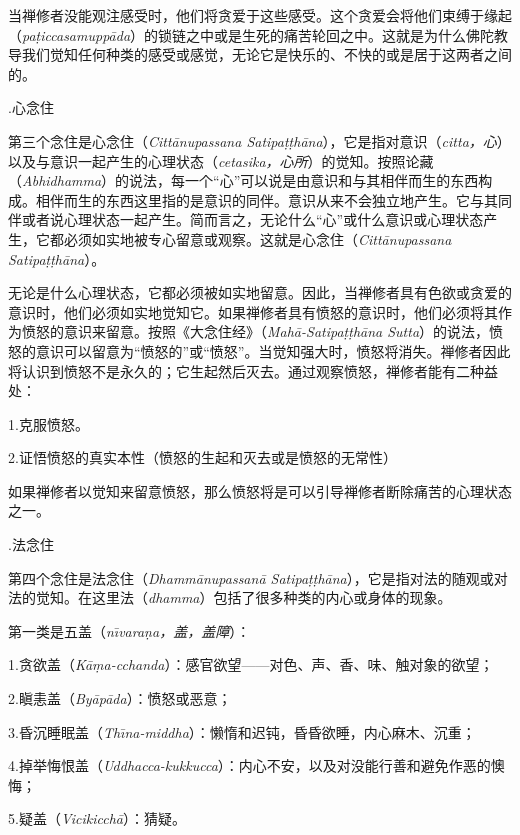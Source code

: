 当禅修者没能观注感受时，他们将贪爱于这些感受。这个贪爱会将他们束缚于缘起（{\it pa\d ticcasamupp\=ada}）的锁链之中或是生死的痛苦轮回之中。这就是为什么佛陀教导我们觉知任何种类的感受或感觉，无论它是快乐的、不快的或是居于这两者之间的。

.\1心念住

第三个念住是心念住（{\it Citt\=anupassana Satipa\d t\d th\=ana}），它是指对意识（{\it citta，心}）以及与意识一起产生的心理状态（{\it cetasika，心所}）的觉知。按照论藏（{\it Abhidhamma}）的说法，每一个“心”可以说是由意识和与其相伴而生的东西构成。相伴而生的东西这里指的是意识的同伴。意识从来不会独立地产生。它与其同伴或者说心理状态一起产生。简而言之，无论什么“心”或什么意识或心理状态产生，它都必须如实地被专心留意或观察。这就是心念住（{\it Citt\=anupassana Satipa\d t\d th\=ana}）。

无论是什么心理状态，它都必须被如实地留意。因此，当禅修者具有色欲或贪爱的意识时，他们必须如实地觉知它。如果禅修者具有愤怒的意识时，他们必须将其作为愤怒的意识来留意。按照《大念住经》（{\it Mah\=a-Satipa\d t\d th\=ana Sutta}）的说法，愤怒的意识可以留意为“愤怒的”或“愤怒”。当觉知强大时，愤怒将消失。禅修者因此将认识到愤怒不是永久的；它生起然后灭去。通过观察愤怒，禅修者能有二种益处：

{
\leftskip=1.6pc
\item{1.}克服愤怒。
\item{2.}证悟愤怒的真实本性（愤怒的生起和灭去或是愤怒的无常性）

}

如果禅修者以觉知来留意愤怒，那么愤怒将是可以引导禅修者断除痛苦的心理状态之一。

.\1法念住

第四个念住是法念住（{\it Dhamm\=anupassan\=a Satipa\d t\d th\=ana}），它是指对法的随观或对法的觉知。在这里法（{\it dhamma}）包括了很多种类的内心或身体的现象。

第一类是五盖（{\it n\=\i vara\d na，盖，盖障}）：

{
\leftskip=1.6pc
\item{1.}贪欲盖（{\it K\=a\d ma-cchanda}）：感官欲望——对色、声、香、味、触对象的欲望；
\item{2.}瞋恚盖（{\it By\=ap\=ada}）：愤怒或恶意；
\item{3.}昏沉睡眠盖（{\it Th\=\i na-middha}）：懒惰和迟钝，昏昏欲睡，内心麻木、沉重；
\item{4.}掉举悔恨盖（{\it Uddhacca-kukkucca}）：内心不安，以及对没能行善和避免作恶的懊悔；
\item{5.}疑盖（{\it Vicikicch\=a}）：猜疑。

}

